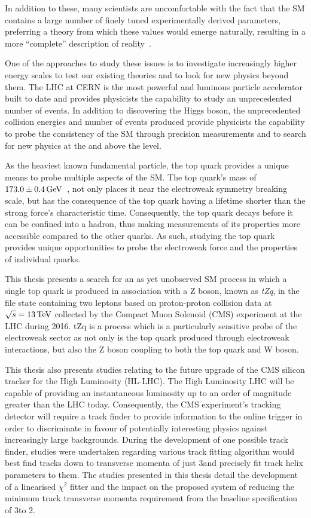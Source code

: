 In addition to these, many scientists are uncomfortable with the fact that the SM contains a large number of finely tuned experimentally derived parameters, preferring a theory from which these values would emerge naturally, resulting in a more ``complete'' description of reality~\cite{Burdman:2007ck}.

One of the approaches to study these issues is to investigate increasingly higher energy scales to test our existing theories and to look for new physics beyond them.
The LHC at CERN is the most powerful and luminous particle accelerator built to date and provides physicists the capability to study an unprecedented number of events.
In addition to discovering the Higgs boson, the unprecedented collision energies and number of events produced provide physicists the capability to probe the consistency of the SM through precision measurements and to search for new physics at the and above the \TeV level.

As the heaviest known fundamental particle, the top quark provides a unique means to probe multiple aspects of the SM.
The top quark's mass of $173.0 \pm 0.4 \,\text{Ge\hspace{-.08em}V}$~\cite{Tanabashi:2018oca}, not only places it near the electroweak symmetry breaking scale, but has the consequence of the top quark having a lifetime shorter than the strong force's characteristic time.
Consequently, the top quark decays before it can be confined into a hadron, thus making measurements of its properties more accessible compared to the other quarks.
As such, studying the top quark provides unique opportunities to probe the electroweak force and the properties of individual quarks.

This thesis presents a search for an as yet unobserved SM process in which a single top quark is produced  in association with a Z boson, known as \emph{tZq}, in the file state containing two leptons based on proton-proton collision data at $\sqrt{s} = 13\,\text{Te\hspace{-.08em}V}$ collected by the Compact Muon Solenoid (CMS) experiment at the LHC during 2016.
tZq is a process which is a particularly sensitive probe of the electroweak sector as not only is the top quark produced through electroweak interactions, but also the Z boson coupling to both the top quark and W boson.

This thesis also presents studies relating to the future upgrade of the CMS silicon tracker for the High Luminosity (HL-LHC).
The High Luminosity LHC will be capable of providing an instantaneous luminosity up to an order of magnitude greater than the LHC today.
Consequently, the CMS experiment's tracking detector will require a track finder to provide information to the online trigger in order to discriminate in favour of potentially interesting physics against increasingly large backgrounds.
During the development of one possible track finder, studies were undertaken regarding various track fitting algorithm would best find tracks down to transverse momenta of just 3\GeV and precisely fit track helix parameters to them.
The studies presented in this thesis detail the development of a linearised $\chi^{2}$ fitter and the impact on the proposed system of reducing the minimum track transverse momenta requirement from the baseline specification of 3\GeV to 2\GeV.
